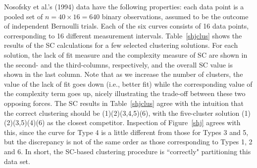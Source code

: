 \documentclass{elsart}
\begin{document}
Nosofsky et al.'s (1994) data have the following properties: each data point is a pooled set of
$n=40\times 16 = 640$ binary observations, assumed to be the outcome of independent Bernoulli
trials. Each of the six curves consists of 16 data points, corresponding to 16 different
measurement intervals. Table~\ref{shjclus} shows the results of the SC calculations for a few
selected clustering solutions. For each solution, the lack of fit measure and the complexity
measure of SC are shown in the second- and the third-columns, respectively, and the overall SC
value is shown in the last column. Note that as we increase the number of clusters, the value of
the lack of fit goes down (i.e., better fit) while the corresponding value of the complexity term
goes up, nicely illustrating the trade-off between these two opposing forces. The SC results in
Table~\ref{shjclus} agree with the intuition that the correct clustering should be
(1)(2)(3,4,5)(6), with the five-cluster solution (1)(2)(3,5)(4)(6) as the closest competitor.
Inspection of Figure~\ref{shj} agrees with this, since the curve for Type 4 is a little different
from those for Types 3 and 5, but the discrepancy is not of the same order as those corresponding
to Types 1, 2 and 6. In short, the SC-based clustering procedure is ``correctly" partitioning this
data set.


\end{document}
